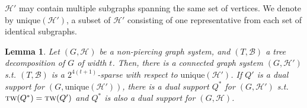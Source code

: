 \documentclass[12pt]{article}
\newcommand{\tw}{\textsc{tw}}
\newcommand{\unique}{\textrm{unique}}
\newtheorem{lemma}[theorem]{Lemma}
\theoremstyle{case}
\begin{document}
$\mathcal{H}'$ may contain multiple subgraphs spanning the same set of
vertices. We denote by $\unique(\mathcal{H}')$, a subset of $\mathcal{H}'$ consisting of one representative from each set of identical subgraphs.

\begin{lemma}
\label{lem:mvi}
Let $(G,\mathcal{H})$ be a non-piercing graph system, 
and $(T,\mathcal{B})$ a tree decomposition of $G$ of width $t$.
Then, there is a connected graph system $(G,\mathcal{H}')$ s.t.
$(T,\mathcal{B})$ is a $2^{4(t+1)}$-sparse with respect to $\unique(\mathcal{H}')$. If
$Q'$ is a dual support for $(G,\unique(\mathcal{H}'))$, there
is a dual support $Q^*$ for $(G,\mathcal{H}')$ s.t. $\tw(Q^*)=\tw(Q')$
and $Q^*$ is also a dual support for $(G,\mathcal{H})$.
\end{lemma}
\end{document}
